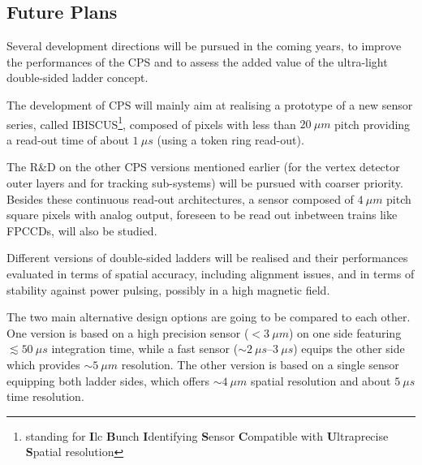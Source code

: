 \subsection{Future Plans}
Several development directions will be pursued in the coming years,
to improve the performances of the CPS and to assess the added value
of the ultra-light double-sided ladder concept.

The development of CPS will mainly aim at realising a prototype of
a new sensor series, called IBISCUS\footnote{standing for {\bf I}lc
{\bf B}unch {\bf I}dentifying {\bf S}ensor {\bf C}ompatible with
{\bf U}ltraprecise {\bf S}patial resolution},
composed of pixels with less than $\SI{20}{\mu m}$ pitch providing a
read-out time of about $\SI{1}{\mu s}$ (using a token ring read-out).

The R\&D on the other CPS versions mentioned earlier (for the vertex
detector outer layers and for tracking sub-systems) will be pursued
with coarser priority.
Besides these continuous read-out architectures, a sensor composed
of $\SI{4}{\mu m}$ pitch square pixels with analog output, foreseen to be
read out inbetween trains like FPCCDs, will also be studied.


Different versions of double-sided ladders will be realised and
their performances evaluated in terms of spatial accuracy, including
alignment issues, and in terms of stability against power pulsing,
possibly in a high magnetic field.

The two main alternative design options are going to be compared
to each other. One version is based on a high precision sensor
($<\SI{3}{\mu m}$) on one side featuring $\lesssim\SI{50}{\mu s}$ integration
time, while a fast sensor ($\sim\SIrange{2}{3}{\mu s}$) equips the other side
which provides $\sim\SI{5}{\mu m}$ resolution. The other version is based
on a single sensor equipping both ladder sides, which offers $\sim\SI{4}{\mu m}$
spatial resolution and about $\SI{5}{\mu s}$ time resolution.
